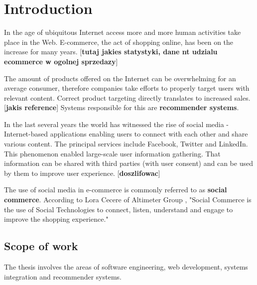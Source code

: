 \documentclass[12pt]{report}
\begin{document}
\tableofcontents	%


\chapter{Introduction} \label{rozdz.wstep} 
In the age of ubiquitous Internet access more and more human activities take place in the Web. E-commerce, the act of shopping online, has been on the increase for many years. [{\bf tutaj jakies statystyki, dane nt udzialu ecommerce w ogolnej sprzedazy}]

The amount of products offered on the Internet can be overwhelming for an average consumer, therefore companies take efforts to properly target users with relevant content. Correct product targeting directly translates to increased sales. [{\bf jakis reference}] Systems responsible for this are {\bf recommender systems}.

In the last several years the world has witnessed the rise of social media - Internet-based applications enabling users to connect with each other and share various content. The principal services include Facebook, Twitter and LinkedIn. This phenomenon enabled large-scale user information gathering. That information can be shared with third parties (with user consent) and can be used by them to improve user experience. [{\bf doszlifowac}]

The use of social media in e-commerce is commonly referred to as {\bf social commerce}. According to Lora Cecere of Altimeter Group \cite{rise_of_social_commerce}, "Social Commerce is the use of Social Technologies to connect, listen, understand and engage to improve the shopping experience."




\section{Scope of work}
The thesis involves the areas of software engineering, web development, systems integration and recommender systems.
\end{document}
